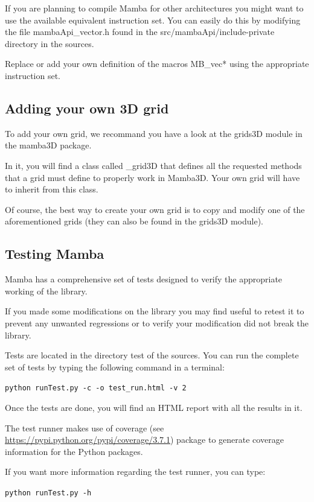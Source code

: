 \documentclass[a4paper,10pt,oneside]{article}
\begin{document}
If you are planning to compile Mamba for other architectures you might want to
use the available equivalent instruction set. You can easily do this by modifying
the file mambaApi\_vector.h found in the src/mambaApi/include-private directory
in the sources.

Replace or add your own definition of the macros MB\_vec* using the appropriate
instruction set.

\subsection{Adding your own 3D grid}
\label{cha:create_grid3D}

To add your own grid, we recommand you have a look at the grids3D module in
the mamba3D package.

In it, you will find a class called \_grid3D that defines all the requested
methods that a grid must define to properly work in Mamba3D. Your own grid
will have to inherit from this class.

Of course, the best way to create your own grid is to copy and modify one
of the aforementioned grids (they can also be found in the grids3D module).

\subsection{Testing Mamba}
\label{cha:testing_mamba}

Mamba has a comprehensive set of tests designed to verify the appropriate
working of the library.

If you made some modifications on the library you may find useful to retest it
to prevent any unwanted regressions or to verify your modification did not break
the library.

Tests are located in the directory test of the sources. You can run the complete
set of tests by typing the following command in a terminal:

\texttt{python runTest.py -c -o test\_run.html -v 2}

Once the tests are done, you will find an HTML report with all the results in it.

The test runner makes use of coverage (see \url{https://pypi.python.org/pypi/coverage/3.7.1})
package to generate coverage information for the Python packages.

If you want more information regarding the test runner, you can type:

\texttt{python runTest.py -h}
\end{document}
